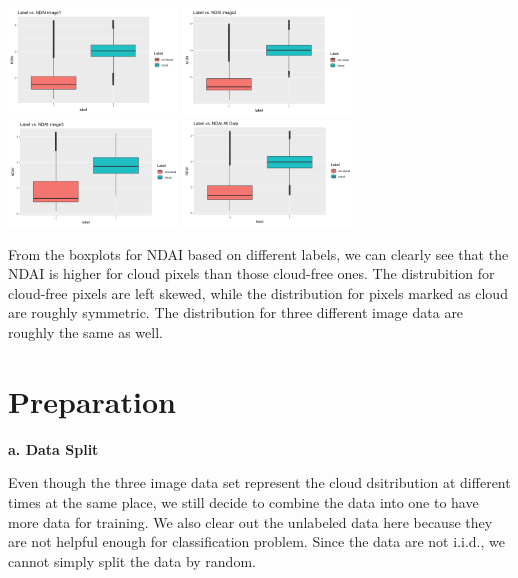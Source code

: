 \documentclass[11pt]{article}
\begin{document}
\includegraphics[width = 4.5cm]{1(c)image12.png}
\includegraphics[width = 4.5cm]{1(c)image13.png}
\includegraphics[width = 4.5cm]{1(c)image14.png}
\includegraphics[width = 4.5cm]{1(c)image15.png}

From the boxplots for NDAI based on different labels, we can clearly see that the NDAI is higher for cloud pixels than those cloud-free ones. The distrubition for cloud-free pixels are left skewed, while the distribution for pixels marked as cloud are roughly symmetric. The distribution for three different image data are roughly the same as well.

\section{Preparation}

\vspace{0.2cm}
\textbf{a. Data Split}

Even though the three image data set represent the cloud dsitribution at different times at the same place, we still decide to combine the data into one to have more data for training. We also clear out the unlabeled data here because they are not helpful enough for classification problem. Since the data are not i.i.d., we cannot simply split the data by random. 
\end{document}

